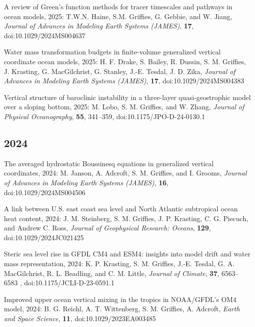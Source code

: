 \begin{etaremune}
\item A review of Green's function methods for tracer timescales and pathways in ocean models, 2025: T.W.N. Haine, S.M. Grif\/f\/ies, G. Gebbie, and W. Jiang, {\it Journal of Advances in Modeling Earth Systems (JAMES)}, {\bf 17}, doi:10.1029/2024MS004637

\item Water mass transformation budgets in finite-volume generalized vertical coordinate ocean models, 2025: H. F. Drake, S. Bailey, R. Dussin, S. M. Griffies, J. Krasting, G. MacGilchrist, G. Stanley, J.-E. Tesdal, J. D. Zika, {\it Journal of Advances in Modeling Earth Systems (JAMES)}, {\bf 17}, doi:10.1029/2024MS004383

\item Vertical structure of baroclinic instability in a three-layer quasi-geostrophic model over a sloping bottom, 2025: M. Lobo, S. M. Grif\/f\/ies, and W. Zhang, {\it Journal of Physical Oceanography}, {\bf 55}, 341--359, 
doi:10.1175/JPO-D-24-0130.1

\subsection*{\sc \color{Maroon} 2024}

\item The averaged hydrostatic Boussinesq equations in generalized vertical coordinates, 2024: M. Janson, A. Adcroft, S. M. Grif\/f\/ies, and I. Grooms, {\it Journal of Advances in Modeling Earth Systems (JAMES)}, {\bf 16}, doi:10.1029/2024MS004506

\item A link between U.S. east coast sea level and North Atlantic subtropical ocean heat content, 2024:  J. M. Steinberg, S. M. Grif\/f\/ies, J. P. Krasting, C. G. Piecuch, and Andrew C. Ross, {\it Journal of Geophysical Research: Oceans}, {\bf 129}, doi:10.1029/2024JC021425




\item Steric sea level rise in GFDL CM4 and ESM4: insights into model drift and water mass representation, 2024: K. P. Krasting, S. M. Grif\/f\/ies, J.-E. Tesdal, G. A. MacGilchrist, R. L. Beadling, and C. M. Little, {\it  Journal of Climate}, {\bf 37}, 6563–6583 , doi:10.1175/JCLI-D-23-0591.1

\item Improved upper ocean vertical mixing in the tropics in NOAA/GFDL's OM4 model, 2024: B. G. Reichl, A. T. Wittenberg, S. M. Grif\/f\/ies, A. Adcroft, {\it Earth and Space Science}, {\bf 11}, doi:10.1029/2023EA003485


\end{etaremune}
